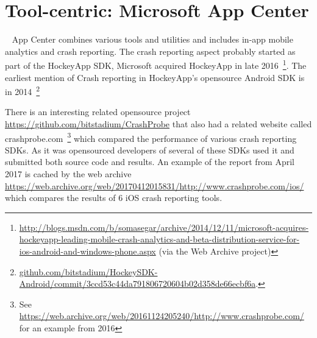\section{Tool-centric: Microsoft App Center}~\label{case-study-overview-microsoft-app-center}
App Center combines various tools and utilities and includes in-app mobile analytics and crash reporting. The crash reporting aspect probably started as part of the HockeyApp SDK, Microsoft acquired HockeyApp in late 2016~\footnote{\href{https://web.archive.org/web/20150702124106/http://blogs.msdn.com/b/somasegar/archive/2014/12/11/microsoft-acquires-hockeyapp-leading-mobile-crash-analytics-and-beta-distribution-service-for-ios-android-and-windows-phone.aspx}{http://blogs.msdn.com/b/somasegar/archive/2014/12/11/microsoft-acquires-hockeyapp-leading-mobile-crash-analytics-and-beta-distribution-service-for-ios-android-and-windows-phone.aspx} (via the Web Archive project)}. The earliest mention of Crash reporting in HockeyApp's opensource Android SDK is in 2014~\footnote{\href{https://github.com/bitstadium/HockeySDK-Android/commit/3ccd53c44da791806720604b02d358de66ecbf6a}{github.com/bitstadium/HockeySDK-Android/commit/3ccd53c44da791806720604b02d358de66ecbf6a}.}

There is an interesting related opensource project \url{https://github.com/bitstadium/CrashProbe} that also had a related website called crashprobe.com~\footnote{See \url{https://web.archive.org/web/20161124205240/http://www.crashprobe.com/} for an example from 2016} which compared the performance of various crash reporting SDKs. As it was opensourced developers of several of these SDKs used it and submitted both source code and results. An example of the report from April 2017 is cached by the web archive \url{https://web.archive.org/web/20170412015831/http://www.crashprobe.com/ios/} which compares the results of 6 iOS crash reporting tools. 

